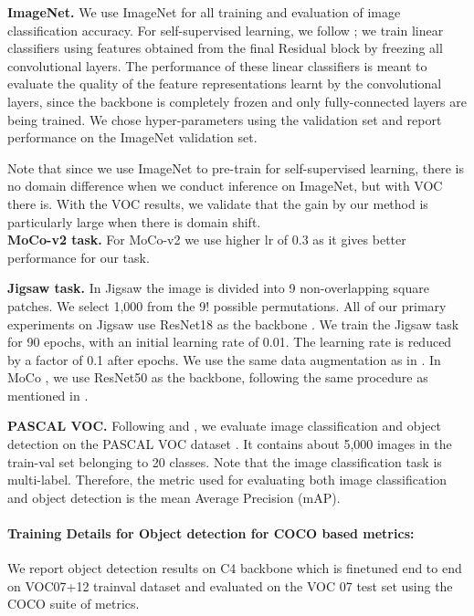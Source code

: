 \documentclass{bmvc2k}
\begin{document}
\noindent\textbf{ImageNet.} 
We use ImageNet for all training and evaluation of image classification accuracy. For self-supervised learning, we follow \cite{Caron2018DeepCF,he2019momentum}; we train linear classifiers using features obtained from the final Residual block by freezing all convolutional layers. 
The performance of these linear classifiers is meant to evaluate the quality of the feature
representations learnt by the convolutional layers, since the backbone is completely frozen and only
fully-connected layers are being trained. 
We chose hyper-parameters using the validation set and report performance on the ImageNet validation set.

Note that since we use ImageNet to pre-train for self-supervised learning, there is no domain difference when we conduct inference on ImageNet, but with VOC there is.  
With the VOC results, we validate that the gain by our method is particularly large when there is domain shift.\\
\noindent\textbf{MoCo-v2 task.} For MoCo-v2 we use  higher lr of 0.3 as it gives better performance for our task.

\noindent\textbf{Jigsaw task.} 
In Jigsaw \cite{Noroozi2016UnsupervisedLO} the image is divided into 9 non-overlapping square patches. We select 1,000 from the 9! possible permutations. All of our primary experiments on Jigsaw use ResNet18 as the backbone \cite{He2015}. We train the Jigsaw task for 90 epochs, with an initial learning rate of 0.01. The learning rate is reduced by a factor of 0.1 after  epochs. We use the same data augmentation as in \cite{Noroozi2016UnsupervisedLO}. In MoCo \cite{He2015}, we use ResNet50\cite{He2015} as the backbone, following the same procedure as mentioned in \cite{he2019momentum}.



\noindent\textbf{PASCAL VOC.} 
Following \cite{Caron2018DeepCF} and \cite{chen2020improved}, we evaluate image classification and object detection on the PASCAL VOC dataset \cite{Everingham2009ThePV}. 
It contains about 5,000 images in the train-val set belonging to 20 classes. 
Note that the image classification task is multi-label. Therefore, the metric used for evaluating both image classification and object detection is the mean Average Precision (mAP). \paragraph{Training Details for Object detection for COCO based metrics:}
We report object detection results on \cite{Ren2015FasterRT} C4 backbone which is finetuned end to end on VOC07+12 trainval dataset and evaluated on the VOC 07
test set using the COCO suite of metrics. 
\end{document}
